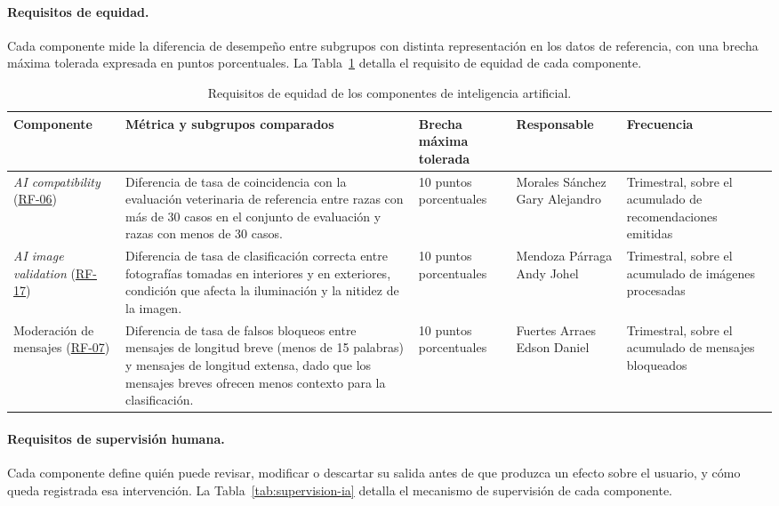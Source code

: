 \documentclass[journal,onecolumn]{IEEEtran}
\begin{document}
\paragraph{Requisitos de equidad.}
Cada componente mide la diferencia de desempeño entre subgrupos con
distinta representación en los datos de referencia, con una brecha máxima
tolerada expresada en puntos porcentuales. La Tabla~\ref{tab:equidad-ia}
detalla el requisito de equidad de cada componente.

\begin{table}[H]
	\centering
	\caption{Requisitos de equidad de los componentes de inteligencia artificial.}
	\label{tab:equidad-ia}
	\small
	\begin{tabularx}{\textwidth}{@{}p{1.9cm} X p{1.7cm} p{1.6cm} p{1.7cm}@{}}
		\toprule
		\textbf{Componente} & \textbf{Métrica y subgrupos comparados} & \textbf{Brecha máxima tolerada} & \textbf{Responsable} & \textbf{Frecuencia} \\
		\midrule
		\emph{AI compatibility} (\hyperref[tab:RF-06]{RF-06}) & Diferencia de tasa de coincidencia con la evaluación veterinaria de referencia entre razas con más de 30 casos en el conjunto de evaluación y razas con menos de 30 casos. & 10 puntos porcentuales & Morales Sánchez Gary Alejandro & Trimestral, sobre el acumulado de recomendaciones emitidas \\
		\addlinespace
		\emph{AI image validation} (\hyperref[tab:RF-17]{RF-17}) & Diferencia de tasa de clasificación correcta entre fotografías tomadas en interiores y en exteriores, condición que afecta la iluminación y la nitidez de la imagen. & 10 puntos porcentuales & Mendoza Párraga Andy Johel & Trimestral, sobre el acumulado de imágenes procesadas \\
		\addlinespace
		Moderación de mensajes (\hyperref[tab:RF-07]{RF-07}) & Diferencia de tasa de falsos bloqueos entre mensajes de longitud breve (menos de 15 palabras) y mensajes de longitud extensa, dado que los mensajes breves ofrecen menos contexto para la clasificación. & 10 puntos porcentuales & Fuertes Arraes Edson Daniel & Trimestral, sobre el acumulado de mensajes bloqueados \\
		\bottomrule
	\end{tabularx}
\end{table}

\paragraph{Requisitos de supervisión humana.}
Cada componente define quién puede revisar, modificar o descartar su
salida antes de que produzca un efecto sobre el usuario, y cómo queda
registrada esa intervención. La Tabla~\ref{tab:supervision-ia} detalla el
mecanismo de supervisión de cada componente.
\end{document}
